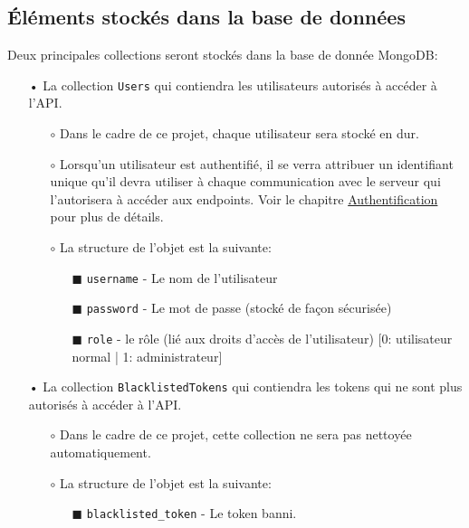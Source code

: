 \subsection{Éléments stockés dans la base de données}

Deux principales collections seront stockés dans la base de donnée MongoDB:

\begin{itemize}
\item[•] La collection \texttt{Users} qui contiendra les utilisateurs autorisés à accéder à l'API. 
\begin{itemize}
\item[$\circ$] Dans le cadre de ce projet, chaque utilisateur sera stocké en dur.
\item[$\circ$] Lorsqu'un utilisateur est authentifié, il se verra attribuer un identifiant unique qu'il devra utiliser à chaque communication avec le serveur qui l'autorisera à accéder aux endpoints. Voir le chapitre \hyperref[ssec:be-auth]{Authentification} pour plus de détails.
\item[$\circ$] La structure de l'objet est la suivante:
\begin{itemize}
\item[\tiny$\blacksquare$] \texttt{username} - Le nom de l'utilisateur
\item[\tiny$\blacksquare$] \texttt{password} - Le mot de passe (stocké de façon sécurisée)
\item[\tiny$\blacksquare$] \texttt{role} - le rôle (lié aux droits d'accès de l'utilisateur) [0: utilisateur normal | 1: administrateur]
\end{itemize}
\end{itemize}
\medskip

\item[•] La collection \texttt{BlacklistedTokens} qui contiendra les tokens qui ne sont plus autorisés à accéder à l'API. 
\begin{itemize}
\item[$\circ$] Dans le cadre de ce projet, cette collection ne sera pas nettoyée automatiquement.
\item[$\circ$] La structure de l'objet est la suivante: 
\begin{itemize}
\item[\tiny$\blacksquare$] \texttt{blacklisted\_token} - Le token banni.
\end{itemize}
\end{itemize}
\clearpage


\end{itemize}
